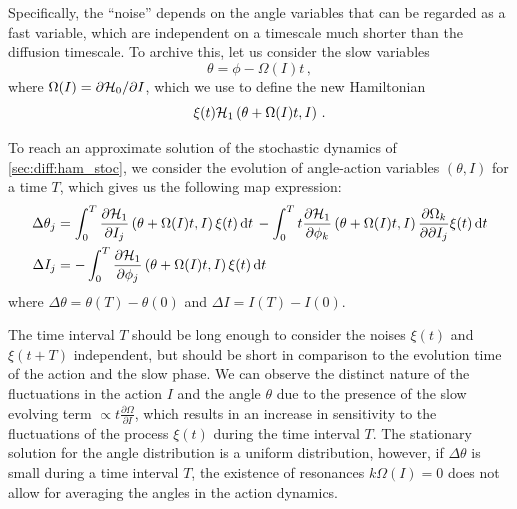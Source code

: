 Specifically, the ``noise'' depends on the angle variables that can be regarded as a fast variable, which are independent on a timescale much shorter than the diffusion timescale. To archive this, let us consider the slow variables
\begin{equation}
    \theta = \phi - \Omega(I) t \,,
\end{equation}
where $\Omega(I)=\partial\mathcal{H}_0/\partial I$, which we use to define the new Hamiltonian
\begin{equation}
    \xi(t)\mathcal{H}_1\left(\theta + \Omega(I)t, I\right) \,.
\end{equation}

To reach an approximate solution of the stochastic dynamics of \eqref{sec:diff:ham_stoc}, we consider the evolution of angle-action variables $(\theta, I)$ for a time $T$, which gives us the following map expression:
\begin{equation}
    \begin{aligned}
    \Delta \theta_j &= \int_0^T \pdv{\mathcal{H}_1}{I_j}\left(\theta+\Omega(I)t,I\right) \xi(t)\,\mathrm{d}t \, -
    \int_0^T t \pdv{\mathcal{H}_1}{\phi_k}\left(\theta+\Omega(I)t,I\right)\pdv{\Omega_k}{\partial I_j}\xi(t)\,\mathrm{d}t \\
    \Delta I_j &= -\int_0^T \pdv{\mathcal{H}_1}{\phi_j}\left(\theta+\Omega(I)t,I\right) \xi(t)\,\mathrm{d}t
    \end{aligned}
\end{equation}
where $\Delta \theta=\theta(T)-\theta(0)$ and $\Delta I=I(T)-I(0)$.

The time interval $T$ should be long enough to consider the noises $\xi(t)$ and $\xi(t+T)$ independent, but should be short in comparison to the evolution time of the action and the slow phase. We can observe the distinct nature of the fluctuations in the action $I$ and the angle $\theta$ due to the presence of the slow evolving term $\propto t \frac{\partial \Omega}{\partial I}$, which results in an increase in sensitivity to the fluctuations of the process $\xi(t)$ during the time interval $T$. The stationary solution for the angle distribution is a uniform distribution, however, if $\Delta \theta$ is small during a time interval $T$, the existence of resonances $k\Omega(I)=0$ does not allow for averaging the angles in the action dynamics.

